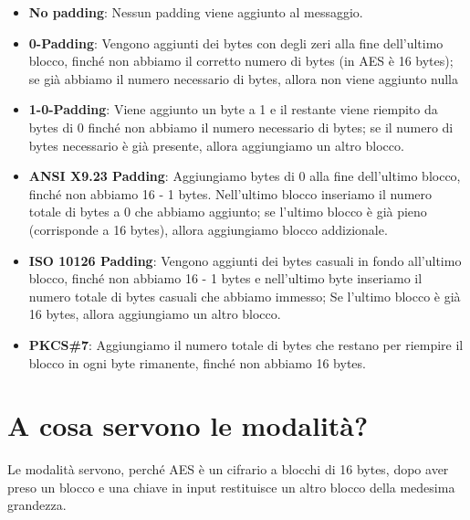 \begin{itemize}
	\item \textsf{\small \textbf{No padding}: Nessun padding viene aggiunto al messaggio.}
	\item \textsf{\small \textbf{0-Padding}: Vengono aggiunti dei bytes con degli zeri alla fine dell'ultimo blocco, finché non abbiamo il corretto numero di bytes (in AES è 16 bytes); se già abbiamo il numero necessario di bytes, allora non viene aggiunto nulla}
	\item \textsf{\small \textbf{1-0-Padding}: Viene aggiunto un byte a 1 e il restante viene riempito da bytes di 0 finché non abbiamo il numero necessario di bytes; se il numero di bytes necessario è già presente, allora aggiungiamo un altro blocco.}
	\item \textsf{\small \textbf{ANSI X9.23 Padding}: Aggiungiamo bytes di 0 alla fine dell'ultimo blocco, finché non abbiamo 16 - 1 bytes. Nell'ultimo blocco inseriamo il numero totale di bytes a 0 che abbiamo aggiunto; se l'ultimo blocco è già pieno (corrisponde a 16 bytes), allora aggiungiamo blocco addizionale.}
	\item \textsf{\small \textbf{ISO 10126 Padding}: Vengono aggiunti dei bytes casuali in fondo all'ultimo blocco, finché non abbiamo 16 - 1 bytes e nell'ultimo byte inseriamo il numero totale di bytes casuali che abbiamo immesso; Se l'ultimo blocco è già 16 bytes, allora aggiungiamo un altro blocco.}
	\item \textsf{\small \textbf{PKCS\#7}: Aggiungiamo il numero totale di bytes che restano per riempire il blocco in ogni byte rimanente, finché non abbiamo 16 bytes.}
\end{itemize}


\section{A cosa servono le modalità?}

   

\textsf{\small Le modalità servono, perché AES è un cifrario a blocchi di 16 bytes, dopo aver preso un blocco e una chiave in input restituisce un altro blocco della medesima grandezza.} %

